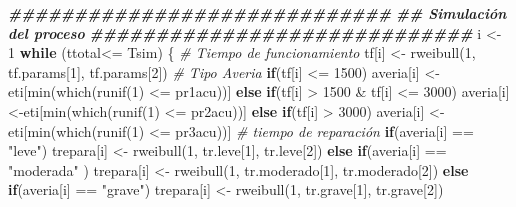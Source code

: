\documentclass[
]{book}
\newenvironment{Shaded}{\begin{snugshade}}{\end{snugshade}}
\newcommand{\CommentTok}[1]{\textcolor[rgb]{0.56,0.35,0.01}{\textit{#1}}}
\newcommand{\ControlFlowTok}[1]{\textcolor[rgb]{0.13,0.29,0.53}{\textbf{#1}}}
\newcommand{\DecValTok}[1]{\textcolor[rgb]{0.00,0.00,0.81}{#1}}
\newcommand{\DocumentationTok}[1]{\textcolor[rgb]{0.56,0.35,0.01}{\textbf{\textit{#1}}}}
\newcommand{\FunctionTok}[1]{\textcolor[rgb]{0.00,0.00,0.00}{#1}}
\newcommand{\NormalTok}[1]{#1}
\newcommand{\OtherTok}[1]{\textcolor[rgb]{0.56,0.35,0.01}{#1}}
\newcommand{\SpecialCharTok}[1]{\textcolor[rgb]{0.00,0.00,0.00}{#1}}
\newcommand{\StringTok}[1]{\textcolor[rgb]{0.31,0.60,0.02}{#1}}
\theoremstyle{definition}
\theoremstyle{definition}
\theoremstyle{definition}
\theoremstyle{definition}
\theoremstyle{remark}
\begin{document}
\begin{Shaded}
\begin{Highlighting}[]
\DocumentationTok{\#\#\#\#\#\#\#\#\#\#\#\#\#\#\#\#\#\#\#\#\#\#\#\#\#\#\#\#\#}
\DocumentationTok{\#\# Simulación del proceso}
\DocumentationTok{\#\#\#\#\#\#\#\#\#\#\#\#\#\#\#\#\#\#\#\#\#\#\#\#\#\#\#\#\#}
\NormalTok{i }\OtherTok{\textless{}{-}} \DecValTok{1}
\ControlFlowTok{while}\NormalTok{ (ttotal}\SpecialCharTok{\textless{}=}\NormalTok{ Tsim)}
\NormalTok{\{}
  \CommentTok{\# Tiempo de funcionamiento}
\NormalTok{  tf[i] }\OtherTok{\textless{}{-}} \FunctionTok{rweibull}\NormalTok{(}\DecValTok{1}\NormalTok{, tf.params[}\DecValTok{1}\NormalTok{], tf.params[}\DecValTok{2}\NormalTok{])}
  \CommentTok{\# Tipo Averia}
  \ControlFlowTok{if}\NormalTok{(tf[i] }\SpecialCharTok{\textless{}=} \DecValTok{1500}\NormalTok{)}
\NormalTok{      averia[i] }\OtherTok{\textless{}{-}}\NormalTok{eti[}\FunctionTok{min}\NormalTok{(}\FunctionTok{which}\NormalTok{(}\FunctionTok{runif}\NormalTok{(}\DecValTok{1}\NormalTok{) }\SpecialCharTok{\textless{}=}\NormalTok{ pr1acu))]}
  \ControlFlowTok{else} \ControlFlowTok{if}\NormalTok{(tf[i] }\SpecialCharTok{\textgreater{}} \DecValTok{1500} \SpecialCharTok{\&}\NormalTok{ tf[i] }\SpecialCharTok{\textless{}=} \DecValTok{3000}\NormalTok{)}
\NormalTok{      averia[i] }\OtherTok{\textless{}{-}}\NormalTok{eti[}\FunctionTok{min}\NormalTok{(}\FunctionTok{which}\NormalTok{(}\FunctionTok{runif}\NormalTok{(}\DecValTok{1}\NormalTok{) }\SpecialCharTok{\textless{}=}\NormalTok{ pr2acu))] }
  \ControlFlowTok{else} \ControlFlowTok{if}\NormalTok{(tf[i] }\SpecialCharTok{\textgreater{}} \DecValTok{3000}\NormalTok{)}
\NormalTok{       averia[i] }\OtherTok{\textless{}{-}}\NormalTok{eti[}\FunctionTok{min}\NormalTok{(}\FunctionTok{which}\NormalTok{(}\FunctionTok{runif}\NormalTok{(}\DecValTok{1}\NormalTok{) }\SpecialCharTok{\textless{}=}\NormalTok{ pr3acu))]}
 \CommentTok{\# tiempo de reparación}
  \ControlFlowTok{if}\NormalTok{(averia[i] }\SpecialCharTok{==} \StringTok{"leve"}\NormalTok{)}
\NormalTok{      trepara[i] }\OtherTok{\textless{}{-}} \FunctionTok{rweibull}\NormalTok{(}\DecValTok{1}\NormalTok{, tr.leve[}\DecValTok{1}\NormalTok{], tr.leve[}\DecValTok{2}\NormalTok{])}
  \ControlFlowTok{else} \ControlFlowTok{if}\NormalTok{(averia[i] }\SpecialCharTok{==} \StringTok{"moderada"}\NormalTok{ )}
\NormalTok{      trepara[i] }\OtherTok{\textless{}{-}} \FunctionTok{rweibull}\NormalTok{(}\DecValTok{1}\NormalTok{, tr.moderado[}\DecValTok{1}\NormalTok{], tr.moderado[}\DecValTok{2}\NormalTok{])}
  \ControlFlowTok{else} \ControlFlowTok{if}\NormalTok{(averia[i] }\SpecialCharTok{==} \StringTok{"grave"}\NormalTok{)}
\NormalTok{      trepara[i] }\OtherTok{\textless{}{-}} \FunctionTok{rweibull}\NormalTok{(}\DecValTok{1}\NormalTok{, tr.grave[}\DecValTok{1}\NormalTok{], tr.grave[}\DecValTok{2}\NormalTok{]) }

\end{Highlighting}
\end{Shaded}
\end{document}
